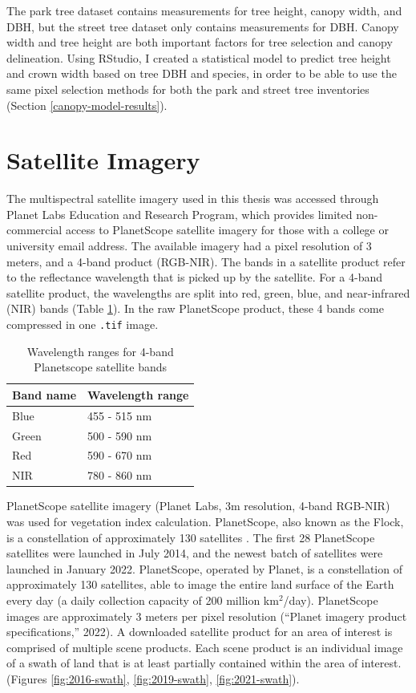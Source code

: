 \documentclass[12pt,twoside]{reedthesis}
\begin{document}
The park tree dataset contains measurements for tree height, canopy
width, and DBH, but the street tree dataset only contains measurements
for DBH. Canopy width and tree height are both important factors for
tree selection and canopy delineation. Using RStudio, I created a
statistical model to predict tree height and crown width based on tree
DBH and species, in order to be able to use the same pixel selection
methods for both the park and street tree inventories (Section
\ref{canopy-model-results}).

\hypertarget{satellite-imagery}{%
\section{Satellite Imagery}\label{satellite-imagery}}

The multispectral satellite imagery used in this thesis was accessed
through Planet Labs Education and Research Program, which provides
limited non-commercial access to PlanetScope satellite imagery for those
with a college or university email address. The available imagery had a
pixel resolution of 3 meters, and a 4-band product (RGB-NIR). The bands
in a satellite product refer to the reflectance wavelength that is
picked up by the satellite. For a 4-band satellite product, the
wavelengths are split into red, green, blue, and near-infrared (NIR)
bands (Table \ref{tab:wavelength}). In the raw PlanetScope product,
these 4 bands come compressed in one \texttt{.tif} image.
\begin{longtable}[t]{ll}
\caption[4-band satellite wavelength ranges]{\label{tab:wavelength}Wavelength ranges for 4-band Planetscope satellite bands}\\
\toprule
Band name & Wavelength range\\
\midrule
Blue & 455 - 515 nm\\
Green & 500 - 590 nm\\
Red & 590 - 670 nm\\
NIR & 780 - 860 nm\\
\bottomrule
\end{longtable}
PlanetScope satellite imagery (Planet Labs, 3m resolution, 4-band
RGB-NIR) was used for vegetation index calculation. PlanetScope, also
known as the Flock, is a constellation of approximately 130 satellites .
The first 28 PlanetScope satellites were launched in July 2014, and the
newest batch of satellites were launched in January 2022. PlanetScope,
operated by Planet, is a constellation of approximately 130 satellites,
able to image the entire land surface of the Earth every day (a daily
collection capacity of 200 million km\(^2\)/day). PlanetScope images are
approximately 3 meters per pixel resolution ({``Planet imagery product specifications,''} 2022). A
downloaded satellite product for an area of interest is comprised of
multiple scene products. Each scene product is an individual image of a
swath of land that is at least partially contained within the area of
interest. (Figures \ref{fig:2016-swath}, \ref{fig:2019-swath},
\ref{fig:2021-swath}).
\end{document}
